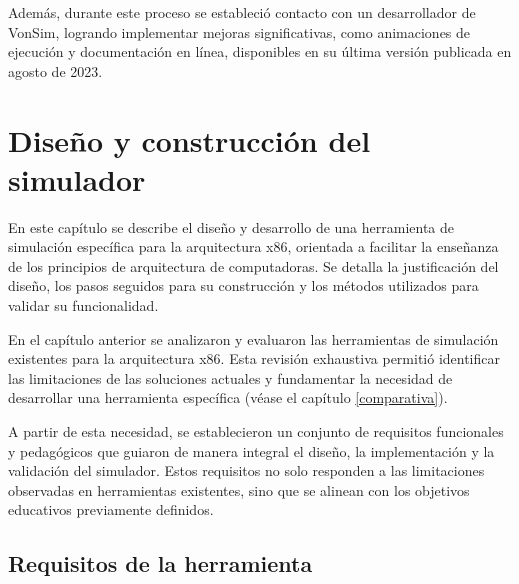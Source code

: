 \documentclass[12pt,oneside]{templates/unerthesis}
\begin{document}
Además, durante este proceso se estableció contacto con un desarrollador de VonSim, logrando implementar mejoras significativas, como animaciones de ejecución y documentación en línea, disponibles en su última versión publicada en agosto de 2023.

\hypertarget{desarrollo}{%
\chapter{Diseño y construcción del simulador}\label{desarrollo}}

En este capítulo se describe el diseño y desarrollo de una herramienta de simulación específica para la arquitectura x86, orientada a facilitar la enseñanza de los principios de arquitectura de computadoras. Se detalla la justificación del diseño, los pasos seguidos para su construcción y los métodos utilizados para validar su funcionalidad.

En el capítulo anterior se analizaron y evaluaron las herramientas de simulación existentes para la arquitectura x86. Esta revisión exhaustiva permitió identificar las limitaciones de las soluciones actuales y fundamentar la necesidad de desarrollar una herramienta específica (véase el capítulo \ref{comparativa}).

A partir de esta necesidad, se establecieron un conjunto de requisitos funcionales y pedagógicos que guiaron de manera integral el diseño, la implementación y la validación del simulador. Estos requisitos no solo responden a las limitaciones observadas en herramientas existentes, sino que se alinean con los objetivos educativos previamente definidos.

\hypertarget{requisitos-de-la-herramienta}{%
\section{Requisitos de la herramienta}\label{requisitos-de-la-herramienta}}
\end{document}
